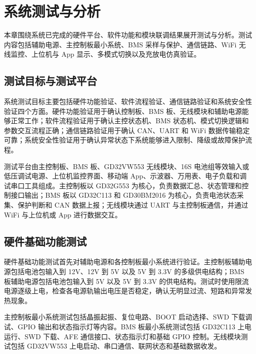 ﻿%

\section{系统测试与分析}

本章围绕系统已完成的硬件平台、软件功能和模块联调结果展开测试与分析。测试内容包括辅助电源、主控制板最小系统、BMS 采样与保护、通信链路、WiFi 无线监控、上位机与 App 显示、多模式切换以及充放电仿真验证。

\subsection{测试目标与测试平台}

系统测试目标主要包括硬件功能验证、软件流程验证、通信链路验证和系统安全性验证四个方面。硬件功能验证用于确认控制板、BMS 板、无线模块和辅助电源能够正常工作；软件流程验证用于确认主控状态机、BMS 状态机、模式切换逻辑和参数交互流程正确；通信链路验证用于确认 CAN、UART 和 WiFi 数据传输稳定可靠；系统安全性验证用于确认异常状态下系统能够进入限制、降级或故障保护流程。

测试平台由主控制板、BMS 板、GD32VW553 无线模块、16S 电池组等效输入或低压调试电源、上位机监控界面、移动端 App、示波器、万用表、电子负载和调试串口工具组成。主控制板以 GD32G553 为核心，负责数据汇总、状态管理和控制接口输出；BMS 板以 GD32C113 和 GD30BM2016 为核心，负责电池状态采集、保护判断和 CAN 数据上报；无线模块通过 UART 与主控制板通信，并通过 WiFi 与上位机或 App 进行数据交互。

\subsection{硬件基础功能测试}

硬件基础功能测试首先对辅助电源和各控制板最小系统进行验证。主控制板辅助电源包括电池包输入到 12V、12V 到 5V 以及 5V 到 3.3V 的多级供电结构；BMS 板辅助电源包括电池包输入到 5V 以及 5V 到 3.3V 的供电结构。测试时使用限流电源逐级上电，检查各电源轨输出电压是否稳定，确认无明显过流、短路和异常发热现象。

主控制板最小系统测试包括晶振起振、复位电路、BOOT 启动选择、SWD 下载调试、GPIO 输出和状态指示灯等内容。BMS 板最小系统测试包括 GD32C113 上电运行、SWD 下载、AFE 通信接口、状态指示灯和基础 GPIO 控制。无线模块测试包括 GD32VW553 上电启动、串口通信、联网状态和基础数据收发。


